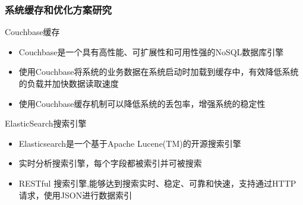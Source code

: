 \documentclass{beamer}
\begin{document}
\begin{frame}
\frametitle{系统缓存和优化方案研究}
  \begin{block}{Couchbase缓存\cite{couchbase1} }
    \begin{itemize}
      \item Couchbase是一个具有高性能、可扩展性和可用性强的NoSQL数据库引擎
      \item 使用Couchbase将系统的业务数据在系统启动时加载到缓存中，有效降低系统的负载并加快数据读取速度 
      \item 使用Couchbase缓存机制可以降低系统的丢包率，增强系统的稳定性
    \end{itemize} 
  \end{block}
  \begin{block}{ElasticSearch搜索引擎\cite{elasticsearch1} }
    \begin{itemize}
      \item Elasticsearch是一个基于Apache Lucene(TM)的开源搜索引擎
      \item 实时分析搜索引擎，每个字段都被索引并可被搜索
      \item RESTful 搜索引擎,能够达到搜索实时、稳定、可靠和快速，支持通过HTTP请求，使用JSON进行数据索引\cite{elasticsearch2}
    \end{itemize} 
  \end{block}
\end{frame}
\end{document}
